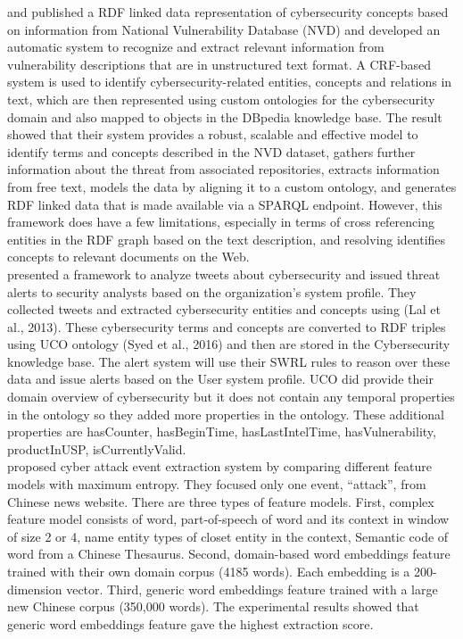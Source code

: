 \indent \cite{joshi2013extracting} and \cite{joshi2013linked} published a RDF linked data representation of cybersecurity concepts  based on information from National Vulnerability Database (NVD) and developed an automatic system to recognize and extract relevant information from vulnerability descriptions that are in unstructured text format. A CRF-based system is used to identify cybersecurity-related entities, concepts and relations in text, which are then represented using custom ontologies for the cybersecurity domain and also mapped to objects in the DBpedia knowledge base. The result showed that their system provides a robust, scalable and effective model to identify terms and concepts described in the NVD dataset, gathers further information about the threat from associated repositories, extracts information from free text, models the data by aligning it to a custom ontology, and generates RDF linked data that is made available via a SPARQL endpoint. However, this framework does have a few limitations, especially in terms of cross referencing entities in the RDF graph based on the text description, and resolving identiﬁes concepts to relevant documents on the Web.\\
\indent \cite{mittal2016cybertwitter} presented a framework to analyze tweets about cybersecurity and issued threat alerts to security analysts based on the organization’s system profile. They collected tweets and extracted cybersecurity entities and concepts using (Lal et al., 2013). These cybersecurity terms and concepts are converted to RDF triples using UCO ontology (Syed et al., 2016) and then are stored in the Cybersecurity knowledge base. The alert system will use their SWRL rules to reason over these data and issue alerts based on the User system profile. UCO did provide their domain overview of cybersecurity but it does not contain any temporal properties in the ontology so they added more properties in the ontology. These additional properties are hasCounter, hasBeginTime, hasLastIntelTime, hasVulnerability, productInUSP, isCurrentlyValid. \\
\indent \cite{qiu2016feature} proposed cyber attack event extraction system by comparing different feature models with maximum entropy. They focused only one event, “attack”,  from Chinese news website. There are three types of feature models. First, complex feature model consists of word, part-of-speech of word and its context in window of size 2 or 4, name entity types of closet entity in the context,  Semantic code of word from a Chinese Thesaurus. Second, domain-based word embeddings feature trained with their own domain corpus (4185 words). Each embedding is a 200-dimension vector. Third, generic word embeddings feature trained with a large new Chinese corpus (350,000 words). The experimental results showed that generic word embeddings feature gave the highest extraction score. \\
